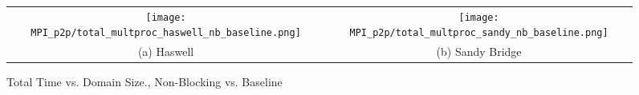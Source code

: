 \begin{enumerate}
		\begin{figure}[h] %
		\hspace*{-0.25\linewidth}\begin{tabular}{cc}
			\texttt{[image: MPI\_p2p/total\_multproc\_haswell\_nb\_baseline.png]} & \texttt{[image: MPI\_p2p/total\_multproc\_sandy\_nb\_baseline.png]} \\
			(a) Haswell &  (b) Sandy Bridge\\[6pt]
		\end{tabular}
		\caption{Total Time vs. Domain Size., Non-Blocking vs. Baseline}
		\label{fig:total_multproc_nb_baseline}
	\end{figure}

\end{enumerate}

